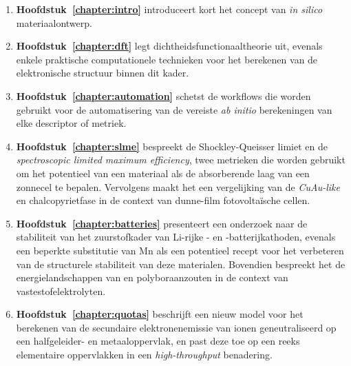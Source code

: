 \begin{enumerate}[]

\vfill
\item \textbf{Hoofdstuk~\ref{chapter:intro}} introduceert kort het concept van \textit{in silico} materiaalontwerp.
\vfill
\item \textbf{Hoofdstuk~\ref{chapter:dft}} legt dichtheidsfunctionaaltheorie uit, evenals enkele praktische computationele technieken voor het berekenen van de elektronische structuur binnen dit kader.
\vfill
\item \textbf{Hoofdstuk~\ref{chapter:automation}} schetst de workflows die worden gebruikt voor de automatisering van de vereiste \textit{ab initio} berekeningen van elke descriptor of metriek.
\vfill
\item \textbf{Hoofdstuk~\ref{chapter:slme}} bespreekt de Shockley-Queisser limiet en de \textit{spectroscopic limited maximum efficiency}, twee metrieken die worden gebruikt om het potentieel van een materiaal als de absorberende laag van een zonnecel te bepalen. Vervolgens maakt het een vergelijking van de \textit{CuAu-like} en chalcopyrietfase in de context van dunne-film fotovoltaïsche cellen.
\vfill
\item \textbf{Hoofdstuk~\ref{chapter:batteries}} presenteert een onderzoek naar de stabiliteit van het zuurstofkader van Li-rijke - en -batterijkathoden, evenals een beperkte substitutie van Mn als een potentieel recept voor het verbeteren van de structurele stabiliteit van deze materialen. Bovendien bespreekt het de energielandschappen van  en  polyboraanzouten in de context van vastestofelektrolyten.
\vfill
\item \textbf{Hoofdstuk~\ref{chapter:quotas}} beschrijft een nieuw model voor het berekenen van de secundaire elektronenemissie van ionen geneutraliseerd op een halfgeleider- en metaaloppervlak, en past deze toe op een reeks elementaire oppervlakken in een \textit{high-throughput} benadering.

\end{enumerate}
